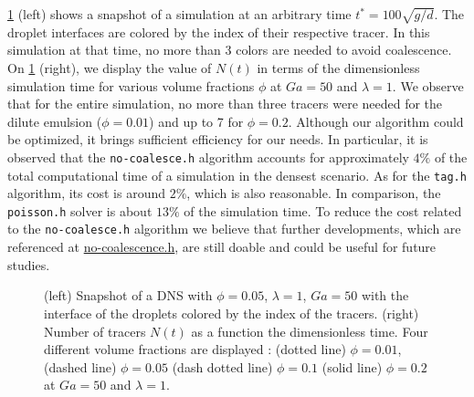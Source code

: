 \documentclass[11pt]{My_preprint}
\begin{document}
\ref{fig:diagram} (left) shows a snapshot of a simulation at an arbitrary time $t^* = 100 \sqrt{g/d}$. 
The droplet interfaces are colored by the index of their respective tracer. 
In this simulation at that time, no more than 3 colors are needed to avoid coalescence.
On \ref{fig:diagram} (right), we display the value of $N(t)$ in terms of the dimensionless simulation time for various volume fractions $\phi$ at $Ga = 50$ and  $\lambda = 1$. 
We observe that for the entire simulation, no more than three tracers were needed for the dilute emulsion ($\phi = 0.01$) and up to 7 for $\phi = 0.2$. 
Although our algorithm could be optimized, it brings sufficient efficiency for our needs. 
In particular, it is observed that the \texttt{no-coalesce.h} algorithm accounts for approximately $4\%$ of the total computational time of a simulation in the densest scenario. As for the \texttt{tag.h} algorithm, its cost is around $2\%$, which is also reasonable. In comparison, the \texttt{poisson.h} solver is about $13\%$ of the simulation time. 
To reduce the cost related to the \texttt{no-coalesce.h} algorithm we believe that further developments, which are referenced at \href{http://basilisk.fr/src/no-coalescence.h}{no-coalescence.h}, are still doable and could be useful for future studies.

\begin{figure}[h!]
    \centering
    \caption{
    (left) Snapshot of a DNS with $\phi = 0.05$, $\lambda = 1$, $Ga = 50$ with the interface of the droplets colored by the index of the tracers.
    (right) Number of tracers $N(t)$ as a function the dimensionless time.
    Four different volume fractions are displayed : (dotted line) $\phi = 0.01$, (dashed line) $\phi = 0.05$ (dash dotted line) $\phi = 0.1$ (solid line) $\phi = 0.2$ at $Ga = 50$ and $\lambda = 1$. 
    }
    \label{fig:diagram}
\end{figure}
\end{document}
